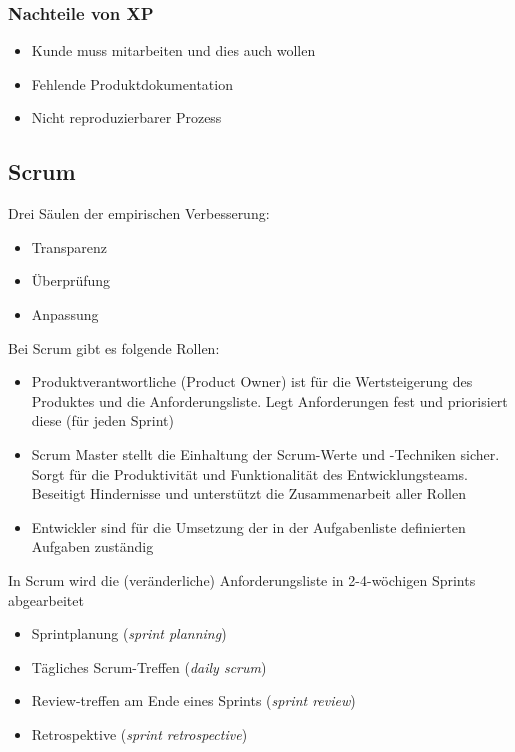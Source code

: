 
\subsubsection{Nachteile von XP}
\begin{itemize}
    \item Kunde muss mitarbeiten und dies auch wollen
    \item Fehlende Produktdokumentation
    \item Nicht reproduzierbarer Prozess
\end{itemize}

\subsection{Scrum}
Drei Säulen der empirischen Verbesserung:
\begin{itemize}
    \item Transparenz
    \item Überprüfung
    \item Anpassung
\end{itemize}

Bei Scrum gibt es folgende Rollen:
\begin{itemize}
    \item Produktverantwortliche (Product Owner) ist für die Wertsteigerung des Produktes und die Anforderungsliste. Legt Anforderungen fest und priorisiert diese (für jeden Sprint)
    \item Scrum Master stellt die Einhaltung der Scrum-Werte und -Techniken sicher. Sorgt für die Produktivität und Funktionalität des Entwicklungsteams. Beseitigt Hindernisse und unterstützt die Zusammenarbeit aller Rollen
    \item Entwickler sind für die Umsetzung der in der Aufgabenliste definierten Aufgaben zuständig
\end{itemize}

In Scrum wird die (veränderliche) Anforderungsliste in 2-4-wöchigen Sprints abgearbeitet
\begin{itemize}
    \item Sprintplanung (\textit{sprint planning})
    \item Tägliches Scrum-Treffen (\textit{daily scrum})
    \item Review-treffen am Ende eines Sprints (\textit{sprint review})
    \item Retrospektive (\textit{sprint retrospective})
\end{itemize}
